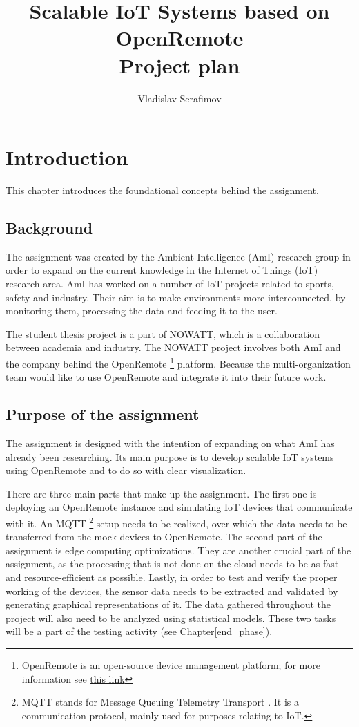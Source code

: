 \documentclass{report}
\title{Scalable IoT Systems based on OpenRemote \\Project plan}
\author{Vladislav Serafimov}
\begin{document}
	\maketitle
	
	
	
	\tableofcontents
	
	\chapter{Introduction}
	This chapter introduces the foundational concepts behind the assignment.
	\section{Background}
	The assignment was created by the Ambient Intelligence (AmI) research group in order to expand on the current knowledge in the Internet of Things (IoT) research area. AmI has worked on a number of IoT projects related to sports, safety and industry. Their aim is to make environments more interconnected, by monitoring them, processing the data and feeding it to the user.
	
	The student thesis project is a part of NOWATT, which is a collaboration between academia and industry. The NOWATT project involves both AmI and the company behind the OpenRemote \footnote{OpenRemote is an open-source device management platform; for more information see \href{https://openremote.io}{this link}} platform. Because the multi-organization team would like to use OpenRemote and integrate it into their future work.
	
	\section{Purpose of the assignment}\label{purpose}
	The assignment is designed with the intention of expanding on what AmI has already been researching. Its main purpose is to develop scalable IoT systems using OpenRemote and to do so with clear visualization.
	
	There are three main parts that make up the assignment. The first one is deploying an OpenRemote instance and simulating IoT devices that communicate with it. An MQTT \footnote{MQTT stands for Message Queuing Telemetry Transport \cite{mqtt_wiki}. It is a communication protocol, mainly used for purposes relating to IoT.} setup needs to be realized, over which the data needs to be transferred from the mock devices to OpenRemote. The second part of the assignment is edge computing optimizations. They are another crucial part of the assignment, as the processing that is not done on the cloud needs to be as fast and resource-efficient as possible. Lastly, in order to test and verify the proper working of the devices, the sensor data needs to be extracted and validated by generating graphical representations of it. The data gathered throughout the project will also need to be analyzed using statistical models. These two tasks will be a part of the testing activity (see Chapter\ref{end_phase}).
	
\end{document}

